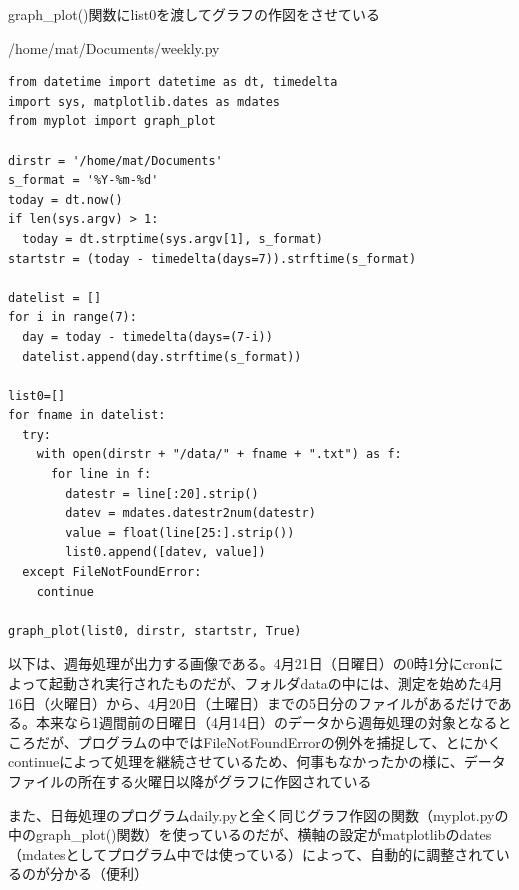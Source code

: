 \documentclass[12pt,a4paper,uplatex]{jsbook}
\begin{document}
	graph\_plot()関数にlist0を渡してグラフの作図をさせている
\begin{spacing}{0.87}
\begin{itembox}[l]{/home/mat/Documents/weekly.py}
	\begin{verbatim}
from datetime import datetime as dt, timedelta
import sys, matplotlib.dates as mdates
from myplot import graph_plot

dirstr = '/home/mat/Documents'
s_format = '%Y-%m-%d'
today = dt.now()
if len(sys.argv) > 1:
  today = dt.strptime(sys.argv[1], s_format)
startstr = (today - timedelta(days=7)).strftime(s_format)

datelist = []
for i in range(7):
  day = today - timedelta(days=(7-i))
  datelist.append(day.strftime(s_format))

list0=[]
for fname in datelist:
  try:
    with open(dirstr + "/data/" + fname + ".txt") as f:
      for line in f:
        datestr = line[:20].strip()
        datev = mdates.datestr2num(datestr)
        value = float(line[25:].strip())
        list0.append([datev, value])
  except FileNotFoundError:
    continue

graph_plot(list0, dirstr, startstr, True)
	\end{verbatim}
\end{itembox}
\end{spacing}


以下は、週毎処理が出力する画像である。4月21日（日曜日）の0時1分にcronによって起動され実行されたものだが、フォルダdataの中には、測定を始めた4月16日（火曜日）から、4月20日（土曜日）までの5日分のファイルがあるだけである。本来なら1週間前の日曜日（4月14日）のデータから週毎処理の対象となるところだが、プログラムの中ではFileNotFoundErrorの例外を捕捉して、とにかくcontinueによって処理を継続させているため、何事もなかったかの様に、データファイルの所在する火曜日以降がグラフに作図されている

また、日毎処理のプログラムdaily.pyと全く同じグラフ作図の関数（myplot.pyの中のgraph\_plot()関数）を使っているのだが、横軸の設定がmatplotlibのdates（mdatesとしてプログラム中では使っている）によって、自動的に調整されているのが分かる（便利）
\end{document}
